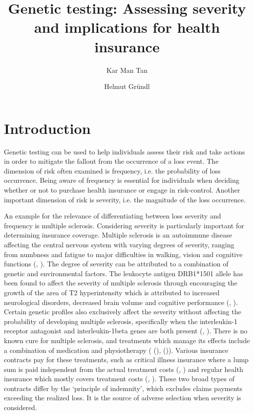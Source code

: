 \documentclass[natbib=false,preprint,12pt]{elsarticle}
\title{Genetic testing: Assessing severity and implications for health insurance}
\author{Kar Man Tan\corref{cor1}\fnref{fn1}}
\author{Helmut Gründl\fnref{fn1}}
\theoremstyle{plain}
\theoremstyle{definition}
\theoremstyle{plain}
\theoremstyle{TheoremNum}
\theoremstyle{CorollaryNum}
\theoremstyle{PropositionNum}
\theoremstyle{TheoremNum}
\begin{document}
\maketitle



\newpage
\section{Introduction}

Genetic testing can be used to help individuals assess their risk and take actions in order to mitigate the fallout from the occurrence of a loss event. The dimension of risk often examined is frequency, i.e. the probability of loss occurrence. Being aware of frequency is essential for individuals when deciding whether or not to purchase health insurance or engage in risk-control. Another important dimension of risk is severity, i.e. the magnitude of the loss occurrence. 

An example for the relevance of differentiating between loss severity and frequency is multiple sclerosis. Considering severity is particularly important for determining insurance coverage. Multiple sclerosis is an autoimmune disease affecting the central nervous system with varying degrees of severity, ranging from numbness and fatigue to major difficulties in walking, vision and cognitive functions (\citeauthor{ghasemi2017multiple}, \citeyear{ghasemi2017multiple}). The degree of severity can be attributed to a combination of genetic and environmental factors. The leukocyte antigen DRB1*1501 allele has been found to affect the severity of multiple sclerosis through encouraging the growth of the area of T2 hyperintensity which is attributed to increased neurological disorders, decreased brain volume and cognitive performance (\citeauthor{okuda2009genotype}, \citeyear{okuda2009genotype}). Certain genetic profiles also exclusively affect the severity without affecting the probability of developing multiple sclerosis, specifically when the interleukin-1 receptor antagonist and interleukin-1beta genes are both present (\citeauthor{schrijver1999association}, \citeyear{schrijver1999association}). There is no known cure for multiple sclerosis, and treatments which manage its effects include a combination of medication and physiotherapy (\citeauthor{ninds2015ms} (\citeyear{ninds2015ms}), \citeauthor*{cree2022new} (\citeyear{cree2022new})). Various insurance contracts pay for these treatments, such as critical illness insurance where a lump sum is paid  independent from the actual treatment costs (\citeauthor{abi2023criticalillness}, \citeyear{abi2023criticalillness}) and regular health insurance which mostly covers treatment costs (\citeauthor{boster2017comparative}, \citeyear{boster2017comparative}). These two broad types of contracts differ by the `principle of indemnity', which excludes claims payments exceeding the realized loss. It is the source of adverse selection when severity is considered. 
\end{document}
